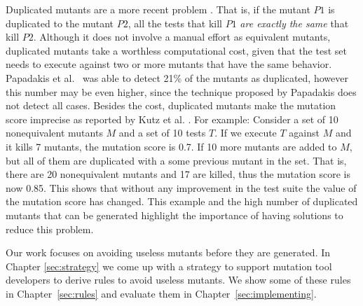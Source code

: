 Duplicated mutants are a more recent problem \cite{PAPADAKIS:2015:1, KINTIS:2017:1}. 
That is, if the mutant $P1$ is duplicated to the mutant $P2$, all the tests that kill $P1$ \textit{are exactly the same} that kill $P2$.
Although it does not involve a manual effort as equivalent mutants, duplicated mutants take a worthless computational cost, given that the test set needs to execute against two or more mutants that have the same behavior.
Papadakis et al.~\cite{PAPADAKIS:2015:1} was able to detect 21\% of the mutants as duplicated, however this number may be even higher, since the technique proposed by Papadakis does not detect all cases.
Besides the cost, duplicated mutants make the mutation score imprecise as reported by Kutz et al. \cite{KURTZ:2016:1}. 
For example: Consider a set of 10 nonequivalent mutants $M$ and a set of 10 tests $T$. 
If we execute $T$ against $M$ and it kills 7 mutants, the mutation score is 0.7. 
If 10 more mutants are added to $M$, but all of them are duplicated with a some previous mutant in the set.
That is, there are 20 nonequivalent mutants and 17 are killed, thus the mutation score is now 0.85.
This shows that without any improvement in the test suite the value of the mutation score has changed.
This example and the high number of duplicated mutants that can be generated highlight the importance of having solutions to reduce this problem.

Our work focuses on avoiding useless mutants before they are generated.
In Chapter \ref{sec:strategy} we come up with a strategy to support mutation tool developers to derive rules to avoid useless mutants. 
We show some of these rules in Chapter~\ref{sec:rules} and evaluate them in Chapter~\ref{sec:implementing}.


